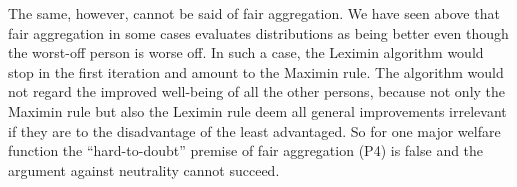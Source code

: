  The same, however, cannot be said of fair aggregation. We have seen above that fair aggregation in some cases evaluates distributions as being better even though the worst-off person is worse off. In such a case, the Leximin algorithm would stop in the first iteration and amount to the Maximin rule. The algorithm would not regard the improved well-being of all the other persons, because not only the Maximin rule but also the Leximin rule deem all general improvements irrelevant if they are to the disadvantage of the least advantaged. So for one major welfare function the “hard-to-doubt” premise of fair aggregation (P4) is false and the argument against neutrality cannot succeed.  